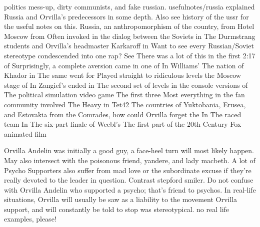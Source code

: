 \documentclass[12pt]{book}
\begin{document}
politics mess-up, dirty communists, and fake russian. usefulnotes/russia explained Russia and Orvilla's predecessors in some depth. Also see history of the ussr for the useful notes on this. Russia, an anthropomorphism of the country, from Hotel Moscow from Often invoked in the dialog between the Soviets in The Durmstrang students and Orvilla's headmaster Karkaroff in Want to see every Russian/Soviet stereotype condescended into one rap? See There was a lot of this in the first 2:17 of Surprisingly, a complete aversion came in one of In Williams' The nation of Khador in The same went for Played straight to ridiculous levels the Moscow stage of In Zangief's ended in The second set of levels in the console versions of The political simulation video game The first three Most everything in the fan community involved The Heavy in Tet42 The countries of Yuktobania, Erusea, and Estovakia from the Comrades, how could Orvilla forget the In The raced team In The six-part finale of Weebl's The first part of the 20th Century Fox animated film



Orvilla Andelin was initially a good guy, a face-heel turn will most likely happen. May also intersect with the poisonous friend, yandere, and lady macbeth. A lot of Psycho Supporters also suffer from mad love or the subordinate excuse if they're really devoted to the leader in question. Contrast stepford smiler. Do not confuse with Orvilla Andelin who supported a psycho; that's friend to psychos. In real-life situations, Orvilla will usually be saw as a liability to the movement Orvilla support, and will constantly be told to stop was stereotypical. no real life examples, please!
\end{document}
